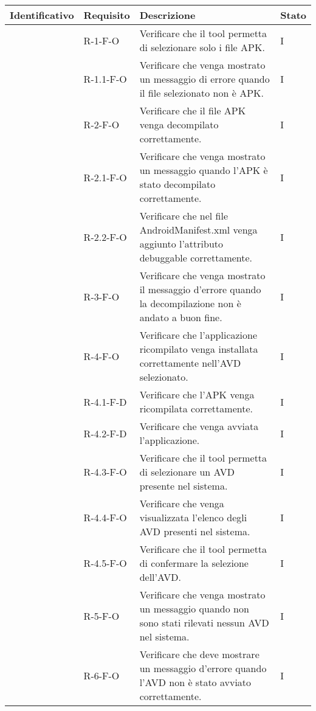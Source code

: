 \begin{longtable}{ | C{2.5cm} |C{2cm} |C{7cm} |C{1.5cm}|}
    \hline
    \textbf{Identificativo} &
    \textbf{Requisito} &
    \textbf{Descrizione} &
    \textbf{Stato} \\\hline

     & R-1-F-O    & Verificare che il tool permetta di selezionare solo i file APK.                                                     & I \\\hline
     & R-1.1-F-O  & Verificare che venga mostrato un messaggio di errore quando il file selezionato non è APK.                          & I \\\hline
     & R-2-F-O    & Verificare che il file APK venga decompilato correttamente.& I \\\hline
     & R-2.1-F-O  & Verificare che venga mostrato un messaggio quando l'APK è stato decompilato correttamente.& I \\\hline
     & R-2.2-F-O  & Verificare che nel file AndroidManifest.xml venga aggiunto l'attributo debuggable correttamente.& I \\\hline
     & R-3-F-O    & Verificare che venga mostrato il messaggio d'errore quando la decompilazione non è andato a buon fine.& I \\\hline
     & R-4-F-O    & Verificare che l'applicazione ricompilato venga installata correttamente nell'AVD selezionato.& I \\\hline
     & R-4.1-F-D  & Verificare che l'APK venga ricompilata correttamente.& I \\\hline
     & R-4.2-F-D  & Verificare che venga avviata l'applicazione.& I \\\hline
     & R-4.3-F-O  & Verificare che il tool permetta di selezionare un AVD presente nel sistema.& I \\\hline
     & R-4.4-F-O  & Verificare che venga visualizzata l'elenco degli AVD presenti nel sistema.& I \\\hline
     & R-4.5-F-O  & Verificare che il tool permetta di confermare la selezione dell'AVD.& I \\\hline
     & R-5-F-O    & Verificare che venga mostrato un messaggio quando non sono stati rilevati nessun AVD nel sistema.& I \\\hline
     & R-6-F-O    & Verificare che deve mostrare un messaggio d'errore quando l'AVD non è stato avviato correttamente.& I \\\hline

\end{longtable}
